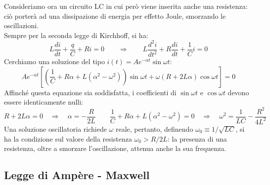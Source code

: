 \documentclass[]{article}
\begin{document}
Consideriamo ora un circuito LC in cui però viene inserita anche una resistenza: ciò porterà ad una dissipazione di energia per effetto Joule, smorzando le oscillazioni. \\ 
Sempre per la seconda legge di Kirchhoff, si ha:
\begin{equation}
	L \frac{di}{dt} + \frac{q}{C} + Ri = 0 \qquad\Longrightarrow\qquad L \frac{d^2 i}{dt^2} + R \frac{di}{dt} + \frac{1}{C} i = 0
	\label{eq:43}
\end{equation}
Cerchiamo una soluzione del tipo $ i(t) = A e^{-\alpha t} \sin\omega t $:
\begin{equation}
	A e^{-\alpha t} \left[ \left( \frac{1}{C} + R\alpha + L(\alpha^2 - \omega^2)\right) \sin\omega t + \omega (R + 2L\alpha) \cos\omega t \right] = 0
	\label{eq:44}
\end{equation}
Affinché questa equazione sia soddisfatta, i coefficienti di $ \sin\omega t $ e $ \cos\omega t $ devono essere identicamente nulli:
\begin{equation}
	R + 2L\alpha = 0 \quad\Rightarrow\quad \alpha = -\frac{R}{2L} \qquad \frac{1}{C} + R\alpha + L (\alpha^2 - \omega^2) = 0 \quad\Rightarrow\quad \omega^2 = \frac{1}{LC} - \frac{R^2}{4L^2}
	\label{eq:45}
\end{equation}
Una soluzione oscillatoria richiede $ \omega $ reale, pertanto, definendo $ \omega_0 \equiv 1 / \sqrt{LC} $, si ha la condizione sul valore della resistenza $ \omega_0 > R / 2L $: la presenza di una resistenza, oltre a smorzare l'oscillazione, attenua anche la sua frequenza.

\subsection{Legge di Ampère - Maxwell}
\end{document}
